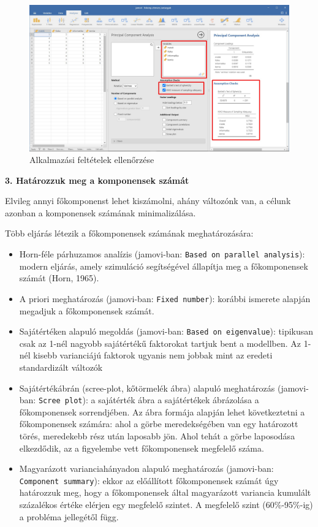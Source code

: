 \documentclass[
  letterpaper,
]{krantz}
\providecommand{\tightlist}{%
  \setlength{\itemsep}{0pt}\setlength{\parskip}{0pt}}\usepackage{longtable,booktabs,array}
\begin{document}
\begin{figure}

{\centering \includegraphics{./images/fokomponens_kep_02.jpg}

}

\caption{Alkalmazási feltételek ellenőrzése}

\end{figure}

\textbf{3. Határozzuk meg a komponensek számát}

Elvileg annyi főkomponenst lehet kiszámolni, ahány változónk van, a
célunk azonban a komponensek számának minimalizálása.

Több eljárás létezik a főkomponensek számának meghatározására:

\begin{itemize}
\tightlist
\item
  Horn-féle párhuzamos analízis (jamovi-ban:
  \texttt{Based\ on\ parallel\ analysis}): modern eljárás, amely
  szimuláció segítségével állapítja meg a főkomponensek számát (Horn,
  1965).
\item
  A priori meghatározás (jamovi-ban: \texttt{Fixed\ number}): korábbi
  ismerete alapján megadjuk a főkomponensek számát.
\item
  Sajátértéken alapuló megoldás (jamovi-ban:
  \texttt{Based\ on\ eigenvalue}): tipikusan csak az 1-nél nagyobb
  sajátértékű faktorokat tartjuk bent a modellben. Az 1-nél kisebb
  varianciájú faktorok ugyanis nem jobbak mint az eredeti standardizált
  változók
\item
  Sajátértékábrán (scree-plot, kőtörmelék ábra) alapuló meghatározás
  (jamovi-ban: \texttt{Scree\ plot}): a sajátérték ábra a sajátértékek
  ábrázolása a főkomponensek sorrendjében. Az ábra formája alapján lehet
  következtetni a főkomponensek számára: ahol a görbe meredekségében van
  egy határozott törés, meredekebb rész után laposabb jön. Ahol tehát a
  görbe laposodása elkezdődik, az a figyelembe vett főkomponensek
  megfelelő száma.
\item
  Magyarázott varianciahányadon alapuló meghatározás (jamovi-ban:
  \texttt{Component\ summary}): ekkor az előállított főkomponensek
  számát úgy határozzuk meg, hogy a főkomponensek által magyarázott
  variancia kumulált százalékos értéke elérjen egy megfelelő szintet. A
  megfelelő szint (60\%-95\%-ig) a probléma jellegétől függ.
\end{itemize}
\end{document}
